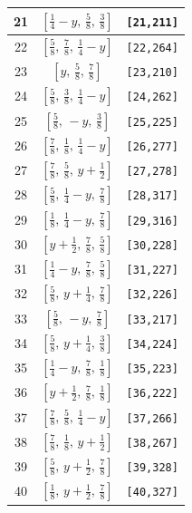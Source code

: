 \documentclass[fleqn,8pt]{jsarticle}
\begin{document}
\begin{longtable}{ccc}
21 & $\left[ \frac{1}{4} - y,\, \frac{5}{8},\, \frac{3}{8} \right]$ & {\tt [21,211]} \\ \hline
22 & $\left[ \frac{5}{8},\, \frac{7}{8},\, \frac{1}{4} - y \right]$ & {\tt [22,264]} \\ \hline
23 & $\left[ y,\, \frac{5}{8},\, \frac{7}{8} \right]$ & {\tt [23,210]} \\ \hline
24 & $\left[ \frac{5}{8},\, \frac{3}{8},\, \frac{1}{4} - y \right]$ & {\tt [24,262]} \\ \hline
25 & $\left[ \frac{5}{8},\, - y,\, \frac{3}{8} \right]$ & {\tt [25,225]} \\ \hline
26 & $\left[ \frac{7}{8},\, \frac{1}{8},\, \frac{1}{4} - y \right]$ & {\tt [26,277]} \\ \hline
27 & $\left[ \frac{7}{8},\, \frac{5}{8},\, y + \frac{1}{2} \right]$ & {\tt [27,278]} \\ \hline
28 & $\left[ \frac{5}{8},\, \frac{1}{4} - y,\, \frac{7}{8} \right]$ & {\tt [28,317]} \\ \hline
29 & $\left[ \frac{1}{8},\, \frac{1}{4} - y,\, \frac{7}{8} \right]$ & {\tt [29,316]} \\ \hline
30 & $\left[ y + \frac{1}{2},\, \frac{7}{8},\, \frac{5}{8} \right]$ & {\tt [30,228]} \\ \hline
31 & $\left[ \frac{1}{4} - y,\, \frac{7}{8},\, \frac{5}{8} \right]$ & {\tt [31,227]} \\ \hline
32 & $\left[ \frac{5}{8},\, y + \frac{1}{4},\, \frac{7}{8} \right]$ & {\tt [32,226]} \\ \hline
33 & $\left[ \frac{5}{8},\, - y,\, \frac{7}{8} \right]$ & {\tt [33,217]} \\ \hline
34 & $\left[ \frac{5}{8},\, y + \frac{1}{4},\, \frac{3}{8} \right]$ & {\tt [34,224]} \\ \hline
35 & $\left[ \frac{1}{4} - y,\, \frac{7}{8},\, \frac{1}{8} \right]$ & {\tt [35,223]} \\ \hline
36 & $\left[ y + \frac{1}{2},\, \frac{7}{8},\, \frac{1}{8} \right]$ & {\tt [36,222]} \\ \hline
37 & $\left[ \frac{7}{8},\, \frac{5}{8},\, \frac{1}{4} - y \right]$ & {\tt [37,266]} \\ \hline
38 & $\left[ \frac{7}{8},\, \frac{1}{8},\, y + \frac{1}{2} \right]$ & {\tt [38,267]} \\ \hline
39 & $\left[ \frac{5}{8},\, y + \frac{1}{2},\, \frac{7}{8} \right]$ & {\tt [39,328]} \\ \hline
40 & $\left[ \frac{1}{8},\, y + \frac{1}{2},\, \frac{7}{8} \right]$ & {\tt [40,327]} \\ \hline

\end{longtable}
\end{document}
